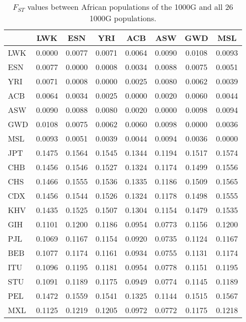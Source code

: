 \begin{table}[ht]
\centering
\caption{$F_{ST}$ values between African populations of the 1000G and all 26 1000G populations.} 
\label{tab:fst-AFR}
\begin{tabular}{|l|c|c|c|c|c|c|c|}
  \hline
 & LWK & ESN & YRI & ACB & ASW & GWD & MSL \\ 
  \hline
LWK & 0.0000 & 0.0077 & 0.0071 & 0.0064 & 0.0090 & 0.0108 & 0.0093 \\ 
  ESN & 0.0077 & 0.0000 & 0.0008 & 0.0034 & 0.0088 & 0.0075 & 0.0051 \\ 
  YRI & 0.0071 & 0.0008 & 0.0000 & 0.0025 & 0.0080 & 0.0062 & 0.0039 \\ 
  ACB & 0.0064 & 0.0034 & 0.0025 & 0.0000 & 0.0020 & 0.0060 & 0.0044 \\ 
  ASW & 0.0090 & 0.0088 & 0.0080 & 0.0020 & 0.0000 & 0.0098 & 0.0094 \\ 
  GWD & 0.0108 & 0.0075 & 0.0062 & 0.0060 & 0.0098 & 0.0000 & 0.0036 \\ 
  MSL & 0.0093 & 0.0051 & 0.0039 & 0.0044 & 0.0094 & 0.0036 & 0.0000 \\ 
   \hline
JPT & 0.1475 & 0.1564 & 0.1545 & 0.1344 & 0.1194 & 0.1517 & 0.1574 \\ 
  CHB & 0.1456 & 0.1546 & 0.1527 & 0.1324 & 0.1174 & 0.1499 & 0.1556 \\ 
  CHS & 0.1466 & 0.1555 & 0.1536 & 0.1335 & 0.1186 & 0.1509 & 0.1565 \\ 
  CDX & 0.1456 & 0.1544 & 0.1526 & 0.1324 & 0.1178 & 0.1498 & 0.1555 \\ 
  KHV & 0.1435 & 0.1525 & 0.1507 & 0.1304 & 0.1154 & 0.1479 & 0.1535 \\ 
   \hline
GIH & 0.1101 & 0.1200 & 0.1186 & 0.0954 & 0.0773 & 0.1156 & 0.1200 \\ 
  PJL & 0.1069 & 0.1167 & 0.1154 & 0.0920 & 0.0735 & 0.1124 & 0.1167 \\ 
  BEB & 0.1077 & 0.1174 & 0.1161 & 0.0934 & 0.0755 & 0.1131 & 0.1174 \\ 
  ITU & 0.1096 & 0.1195 & 0.1181 & 0.0954 & 0.0778 & 0.1151 & 0.1195 \\ 
  STU & 0.1091 & 0.1189 & 0.1175 & 0.0949 & 0.0774 & 0.1145 & 0.1189 \\ 
   \hline
PEL & 0.1472 & 0.1559 & 0.1541 & 0.1325 & 0.1144 & 0.1515 & 0.1567 \\ 
  MXL & 0.1125 & 0.1219 & 0.1205 & 0.0972 & 0.0772 & 0.1175 & 0.1218 \\ 

\end{tabular}
\end{table}
